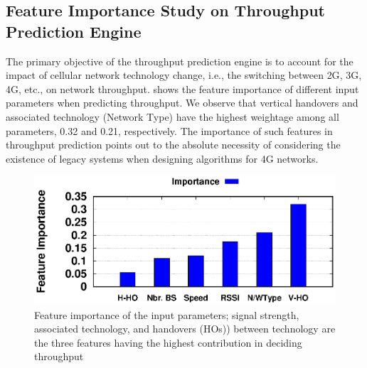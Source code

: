 \subsection{Feature Importance Study on Throughput Prediction Engine} The primary objective of the throughput prediction engine is to account for the impact of cellular network technology change, i.e., the switching between \ac{2G}, \ac{3G}, \ac{4G}, etc., on network throughput.
\fig{\ref{fig:chap04:feature_imp}} shows the feature importance of different input parameters when predicting throughput. We observe that vertical handovers and associated technology (Network Type) have the highest weightage among all parameters, 0.32 and 0.21, respectively. The importance of such features in throughput prediction points out to
the absolute necessity of considering the existence of legacy systems when designing algorithms for 4G networks.
\begin{figure}[!ht]
    \centering
    \includegraphics[width=0.7\linewidth]{new_results/simres/FeatureImpotance}
    \caption{Feature importance of the input parameters; signal strength, associated technology, and handovers (HOs)) between technology are the three features having the highest contribution in deciding throughput}\vspace*{-0.5cm}
    \label{fig:chap04:feature_imp}
\end{figure}
